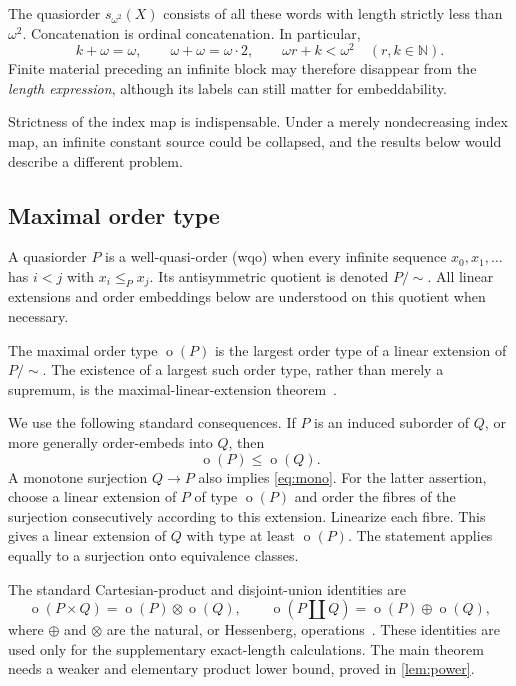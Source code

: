 \documentclass[11pt]{article}
\numberwithin{equation}{section}
\theoremstyle{plain}
\theoremstyle{definition}
\theoremstyle{remark}
\newcommand{\ot}{\operatorname{o}}
\newcommand{\N}{\mathbb N}
\newcommand{\equ}{\sim}
\begin{document}
The quasiorder $s_{\omega^2}(X)$ consists of all these words with length strictly less than $\omega^2$. Concatenation is ordinal concatenation. In particular,
\[
 k+\omega=\omega,
 \qquad
 \omega+\omega=\omega\cdot2,
 \qquad
 \omega r+k<\omega^2\quad(r,k\in\N).
\]
Finite material preceding an infinite block may therefore disappear from the \emph{length expression}, although its labels can still matter for embeddability.

Strictness of the index map is indispensable. Under a merely nondecreasing index map, an infinite constant source could be collapsed, and the results below would describe a different problem.

\subsection{Maximal order type}

A quasiorder $P$ is a well-quasi-order (wqo) when every infinite sequence $x_0,x_1,\ldots$ has $i<j$ with $x_i\leq_P x_j$. Its antisymmetric quotient is denoted $P/{\equ}$. All linear extensions and order embeddings below are understood on this quotient when necessary.

The maximal order type $\ot(P)$ is the largest order type of a linear extension of $P/{\equ}$. The existence of a largest such order type, rather than merely a supremum, is the maximal-linear-extension theorem~\cite{DJP}.

We use the following standard consequences. If $P$ is an induced suborder of $Q$, or more generally order-embeds into $Q$, then
\begin{equation}\label{eq:mono}
 \ot(P)\leq\ot(Q).
\end{equation}
A monotone surjection $Q\to P$ also implies \eqref{eq:mono}. For the latter assertion, choose a linear extension of $P$ of type $\ot(P)$ and order the fibres of the surjection consecutively according to this extension. Linearize each fibre. This gives a linear extension of $Q$ with type at least $\ot(P)$. The statement applies equally to a surjection onto equivalence classes.

The standard Cartesian-product and disjoint-union identities are
\begin{equation}\label{eq:naturalops}
 \ot(P\times Q)=\ot(P)\otimes\ot(Q),
 \qquad
 \ot(P\amalg Q)=\ot(P)\oplus\ot(Q),
\end{equation}
where $\oplus$ and $\otimes$ are the natural, or Hessenberg, operations~\cite{DJP}. These identities are used only for the supplementary exact-length calculations. The main theorem needs a weaker and elementary product lower bound, proved in \cref{lem:power}.
\end{document}
